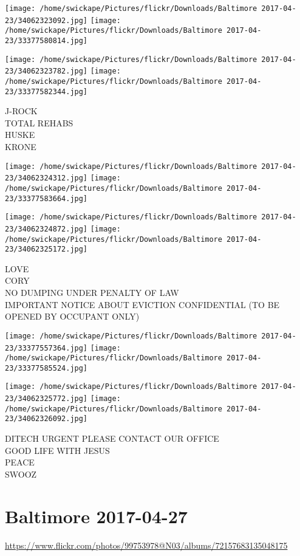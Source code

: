 \documentclass[10pt,letterpaper]{article}
\begin{document}
\texttt{[image: /home/swickape/Pictures/flickr/Downloads/Baltimore 2017-04-23/34062323092.jpg]}
\texttt{[image: /home/swickape/Pictures/flickr/Downloads/Baltimore 2017-04-23/33377580814.jpg]}

\texttt{[image: /home/swickape/Pictures/flickr/Downloads/Baltimore 2017-04-23/34062323782.jpg]}
\texttt{[image: /home/swickape/Pictures/flickr/Downloads/Baltimore 2017-04-23/33377582344.jpg]}

J{-}ROCK\\
TOTAL REHABS\\
HUSKE\\
KRONE
\pagebreak

\texttt{[image: /home/swickape/Pictures/flickr/Downloads/Baltimore 2017-04-23/34062324312.jpg]}
\texttt{[image: /home/swickape/Pictures/flickr/Downloads/Baltimore 2017-04-23/33377583664.jpg]}

\texttt{[image: /home/swickape/Pictures/flickr/Downloads/Baltimore 2017-04-23/34062324872.jpg]}
\texttt{[image: /home/swickape/Pictures/flickr/Downloads/Baltimore 2017-04-23/34062325172.jpg]}

LOVE\\
CORY\\
NO DUMPING UNDER PENALTY OF LAW\\
IMPORTANT NOTICE ABOUT EVICTION CONFIDENTIAL (TO BE OPENED BY OCCUPANT ONLY)
\pagebreak

\texttt{[image: /home/swickape/Pictures/flickr/Downloads/Baltimore 2017-04-23/33377557364.jpg]}
\texttt{[image: /home/swickape/Pictures/flickr/Downloads/Baltimore 2017-04-23/33377585524.jpg]}

\texttt{[image: /home/swickape/Pictures/flickr/Downloads/Baltimore 2017-04-23/34062325772.jpg]}
\texttt{[image: /home/swickape/Pictures/flickr/Downloads/Baltimore 2017-04-23/34062326092.jpg]}

DITECH URGENT PLEASE CONTACT OUR OFFICE\\
GOOD LIFE WITH JESUS\\
PEACE\\
SWOOZ
\pagebreak

\section*{Baltimore 2017-04-27}

\url{https://www.flickr.com/photos/99753978@N03/albums/72157683135048175}
\end{document}
